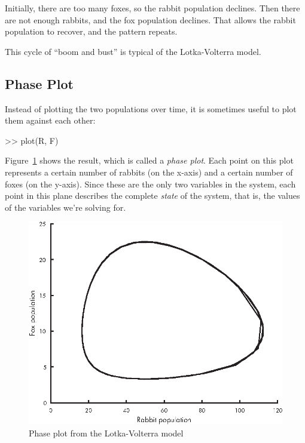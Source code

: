 
Initially, there are too many foxes, so the rabbit population declines.  Then there are not enough rabbits, and the fox population declines.  That allows the rabbit population to recover, and the pattern repeats.

This cycle of ``boom and bust'' is typical of the Lotka-Volterra model.


\subsection{Phase Plot}

Instead of plotting the two populations over time, it is sometimes useful to plot them against each other:

\begin{code}
>> plot(R, F)
\end{code}

Figure~\ref{fig:phase} shows the result, which is called a \emph{phase plot}.
Each point on this plot represents a certain number of rabbits (on the
x-axis) and a certain number of foxes (on the y-axis).
Since these are the only two variables in the system, each point in
this plane describes the complete \emph{state} of the system, that is, the values of
the variables we're solving for.

\begin{figure}[ht]
\centerline{\includegraphics[scale=0.8]{images/figure10_02_new.eps}}
\caption{Phase plot from the Lotka-Volterra model}
\label{fig:phase}
\end{figure}

